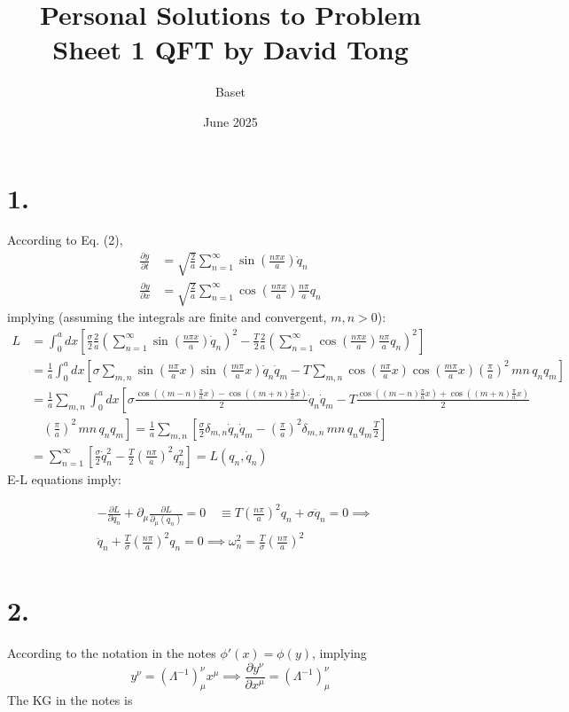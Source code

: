 \documentclass{article}
\title{Personal Solutions to Problem Sheet 1 QFT by David Tong}
\author{Baset}
\date{June 2025}
\begin{document}
\maketitle
\section*{1.}
According to Eq. (2),
\begin{equation}
    \begin{split}
        \frac{\partial y}{\partial t} &= \sqrt{\frac{2}{a}}\sum_{n=1}^\infty \sin(\frac{n\pi x}{a})\dot{q}_n\\
        \frac{\partial y}{\partial x} &= \sqrt{\frac{2}{a}}\sum_{n=1}^\infty \cos(\frac{n\pi x}{a})\frac{n\pi}{a}q_n
    \end{split}
\end{equation}
implying (assuming the integrals are finite and convergent, $m,n > 0$):
\begin{equation}
    \begin{split}
        L &= \int_0^a dx \left[\frac{\sigma}{2}\frac{2}{a}\left(\sum_{n=1}^\infty \sin\left(\frac{n\pi x}{a}\right)\dot{q}_n\right)^2 - \frac{T}{2}\frac{2}{a}\left(\sum_{n=1}^\infty \cos\left(\frac{n\pi x}{a}\right)\frac{n\pi}{a}q_n\right)^2 \right]\\
          &=\frac{1}{a}\int_0^a dx\left[\sigma \sum_{m,n}\sin(\frac{n\pi}{a}x)\sin(\frac{m\pi}{a}x)\dot{q}_n\dot{q}_m-T\sum_{m,n}\cos(\frac{n\pi}{a}x)\cos(\frac{m\pi}{a}x)(\frac{\pi}{a})^2 \, mn\, q_nq_m  \right] \\
          &= \frac{1}{a}\sum_{m,n}\int_0^a dx \left[\sigma \frac{\cos((m-n)\frac{\pi}{a}x)-\cos((m+n)\frac{\pi}{a}x)}{2}\dot{q}_n\dot{q}_m - T \frac{\cos((m-n)\frac{\pi}{a}x)+\cos((m+n)\frac{\pi}{a}x)}{2}\right.\\
          &\left.\quad(\frac{\pi}{a})^2 \, mn\, q_nq_m \right] = \frac{1}{a}\sum_{m,n} \left[ \frac{\sigma}{2}\delta_{m,n}\dot{q}_n\dot{q}_m - (\frac{\pi}{a})^2 \delta_{m,n} \, mn\, q_nq_m \frac{T}{2} \right] \\
          &= \sum_{n=1}^\infty \left[ \frac{\sigma}{2}\dot{q}_n^2 - \frac{T}{2}(\frac{n\pi}{a})^2 q_n^2  \right] = L(q_n,\dot{q}_n)  
        \end{split}
\end{equation}
E-L equations imply:

\begin{equation}
    \begin{split}
       & -\frac{\partial L}{\partial q_n} + \partial_\mu \frac{\partial L}{\partial_\mu(q_n)} = 0 \quad \equiv T(\frac{n\pi}{a})^2q_n + \sigma \ddot{q}_n = 0 \implies \\
       & \ddot{q}_n + \frac{T}{\sigma}(\frac{n\pi}{a})^2 q_n = 0 \implies \omega_n^2 = \frac{T}{\sigma} (\frac{n\pi}{a})^2\\
    \end{split}
\end{equation}


\section*{2.}
According to the notation in the notes $\phi'(x) = \phi(y)$, implying
\begin{equation}
    y^\nu = (\Lambda^{-1})_\mu^\nu x^\mu \implies \frac{\partial y^\nu}{\partial x^\mu} = (\Lambda^{-1})_\mu^\nu
\end{equation}
The KG in the notes is $$
\end{document}
